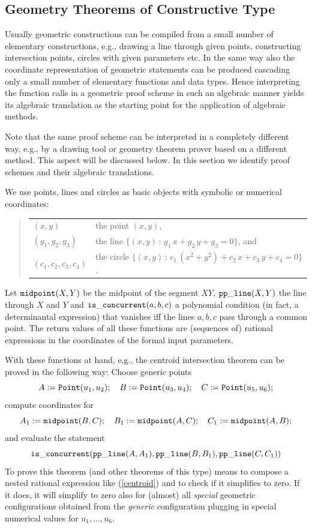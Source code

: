 \documentclass[11pt]{article}
\newcommand{\gf}[1]{{\tt #1}\/}
\begin{document}
\subsection{Geometry Theorems of Constructive Type}

Usually geometric constructions can be compiled from a small number of
elementary constructions, e.g., drawing a line through given points,
constructing intersection points, circles with given parameters etc.  In the
same way also the coordinate representation of geometric statements can be
produced cascading only a small number of elementary functions and data types.
Hence interpreting the function calls in a geometric proof scheme in such an
algebraic manner yields its algebraic translation as the starting point for
the application of algebraic methods.

Note that the same proof scheme can be interpreted in a completely different
way, e.g., by a drawing tool or geometry theorem prover based on a different
method. This aspect will be discussed below.  In this section we identify
proof schemes and their algebraic translations. 

We use points, lines and circles as basic objects with symbolic or numerical
coordinates:
\begin{quote}
\begin{tabular}{ll}
$(x,y)$ & the point $(x,y)$,\\
$(g_1,g_2,g_3)$ & the line $\{(x,y)\,:\, g_1\,x+g_2\,y+g_3=0\}$, and\\
$(c_1,c_2,c_3,c_4)$ & the circle $\{(x,y) \,:\,
c_1\,(x^2+y^2)+c_2\,x+c_3\,y+c_4=0 \}$.
\end{tabular}
\end{quote}
Let $\gf{midpoint}(X,Y)$ be the midpoint of the segment ${XY}$,
$\gf{pp\_line}(X,Y)$ the line through $X$ and $Y$ and
$\gf{is\_concurrent}(a,b,c)$ a polynomial condition (in fact, a determinantal
expression) that vanishes iff the lines $a,b,c$ pass through a common point.
The return values of all these functions are (sequences of) rational
expressions in the coordinates of the formal input parameters.  \medskip

With these functions at hand, e.g., the centroid intersection theorem can be
proved in the following way: Choose generic points
\[A:=\gf{Point}(u_1,u_2);\quad B:=\gf{Point}(u_3,u_4);\quad
C:=\gf{Point}(u_5,u_6);
\] 
compute coordinates for 
\[A_1:=\gf{midpoint}(B,C);\quad B_1:=\gf{midpoint}(A,C);\quad
C_1:=\gf{midpoint}(A,B);
\]
and evaluate the statement
\begin{equation}\label{centroid}
\gf{is\_concurrent}(\gf{pp\_line}(A,A_1), \gf{pp\_line}(B,B_1),
\gf{pp\_line}(C,C_1))
\end{equation}
To prove this theorem (and other theorems of this type) means to compose a
nested rational expression like (\ref{centroid}) and to check if it simplifies
to zero. If it does, it will simplify to zero also for (almost) all {\em
  special} geometric configurations obtained from the {\em generic}
configuration plugging in special numerical values for $u_1,\ldots,u_6$.
\medskip
\end{document}
